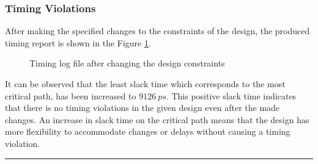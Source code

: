\documentclass[a4paper,11pt]{article}%
\begin{document}
\pagebreak
\subsubsection{Timing Violations}

After making the specified changes to the constraints of the design, the produced timing report is shown in the Figure \ref{fig:timing_log3}.

\begin{figure}[H]
	\centering
	\caption{Timing log file after changing the design constraints}
	\label{fig:timing_log3}
\end{figure}

It can be observed that the least slack time which corresponds to the most critical path, has been increased to $9126~ps$. This positive slack time indicates that there is no timing violations in the given design even after the made changes. An increase in slack time on the critical path means that the design has more flexibility to accommodate changes or delays without causing a timing violation.

\vfill
\hrule
{\small


}
\end{document}
